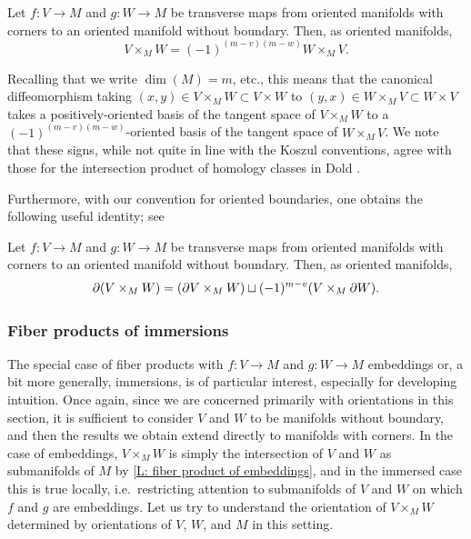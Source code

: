 \begin{proposition}\label{P: commute oriented fiber}
	Let $f \colon V \to M$ and $g \colon W \to M$ be transverse maps from oriented manifolds with corners to an oriented manifold without boundary.
	Then, as oriented manifolds,
	\begin{equation*}
		V \times_M W = (-1)^{(m-v)(m-w)}W \times_M V.
	\end{equation*}
\end{proposition}

Recalling that we write $\dim(M)=m$, etc., this means that the canonical diffeomorphism taking $(x,y) \in V \times_M W \subset V \times W$ to $(y,x) \in W \times_M V \subset W \times V$ takes a positively-oriented basis of the tangent space of $V \times_M W$ to a $(-1)^{(m-v)(m-w)}$-oriented basis of the tangent space of $W \times_M V$.
We note that these signs, while not quite in line with the Koszul conventions, agree with those for the intersection product of homology classes in Dold \cite[Section VIII.13]{Dol72}.

Furthermore, with our convention for oriented boundaries, one obtains the following useful identity; see \cite[Propositions 7.4 and 7.5]{Joy12}

\begin{proposition}\label{P: oriented fiber boundary}
	Let $f \colon V \to M$ and $g \colon W \to M$ be transverse maps from oriented manifolds with corners to an oriented manifold without boundary.
	Then, as oriented manifolds,
	\begin{equation*}
		\partial (V \times_M W) = (\partial V \times_M W) \sqcup (-1)^{m-v}(V \times_M \partial W).
	\end{equation*}
\end{proposition}

\subsubsection{Fiber products of immersions}\label{S:products of immersions}

The special case of fiber products with $f \colon V \to M$ and $g \colon W \to M$ embeddings or, a bit more generally, immersions, is of particular interest, especially for developing intuition.
Once again, since we are concerned primarily with orientations in this section, it is sufficient to consider $V$ and $W$ to be manifolds without boundary, and then the results we obtain extend directly to manifolds with corners.
In the case of embeddings, $V \times_M W$ is simply the intersection of $V$ and $W$ as submanifolds of $M$ by \cref{L: fiber product of embeddings}, and in the immersed case this is true locally, i.e.\ restricting attention to submanifolds of $V$ and $W$ on which $f$ and $g$ are embeddings.
Let us try to understand the orientation of $V \times_M W$ determined by orientations of $V$, $W$, and $M$ in this setting.

